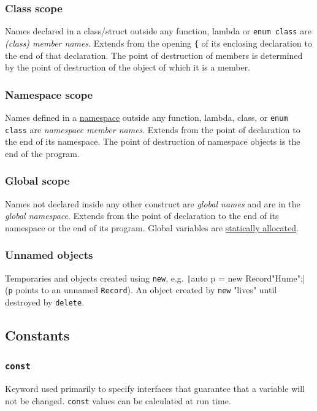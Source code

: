 \documentclass[table, xcdraw]{article}%
\begin{document}
\subsubsection{Class scope} \label{classscope}
Names declared in a class/struct outside any function, lambda or \texttt{enum class} are \textit{(class) member names}. Extends  from  the  opening \texttt{\{} of its enclosing declaration to the end of that declaration. The point of destruction of members is  determined by the point of destruction of the object of which it is a member.

\subsubsection{Namespace scope} \label{namespacescope}
Names defined in a \hyperref[namespace]{namespace} outside any function, lambda, class, or \texttt{enum class} are \textit{namespace member names}. Extends from the point of declaration to the end of its namespace. The point of destruction of namespace objects is the end of the program.

\subsubsection{Global scope} \label{globalscope}
Names not declared inside any other construct are \textit{global names} and are in the \textit{global namespace}. Extends from the point of declaration to the end of its namespace or the end of its program. Global variables are \hyperref[staticallocation]{statically allocated}.

\subsubsection{Unnamed objects}
Temporaries and objects created using \texttt{new}, e.g. \texttt|auto p = new Record{"Hume"};| (\texttt{p} points to an unnamed \texttt{Record}). An object created by \texttt{new} "lives" until destroyed by \texttt{delete}.

\subsection{Constants}

\subsubsection{\texttt{const}}
Keyword used primarily to specify interfaces that guarantee that a variable will not be changed. \texttt{const} values can be calculated at run time.
\end{document}
